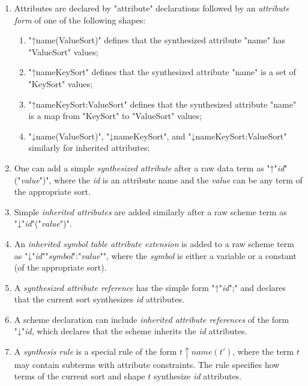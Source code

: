 \documentclass[12pt]{article} %
\begin{document}
\begin{manual}\label{man:attributes}\leavevmode
  \begin{enumerate}

  \item Attributes are declared by "attribute" declarations followed by an \emph{attribute form} of
    one of the following shapes:
    \begin{enumerate}
    \item "↑name(ValueSort)" defines that the synthesized attribute "name" has "ValueSort" values;
    \item "↑name{KeySort}" defines that the synthesized attribute "name" is a set of "KeySort" values;
    \item "↑name{KeySort:ValueSort}" defines that the synthesized attribute "name" is a map from
      "KeySort" to "ValueSort" values;
    \item "↓name(ValueSort)", "↓name{KeySort}", and "↓name{KeySort:ValueSort}" similarly for
      inherited attributes;
    \end{enumerate}

  \item One can add a simple \emph{synthesized attribute} after a raw data term as
    "↑"\emph{id}"("\emph{value}")", where the \emph{id} is an attribute name and the \emph{value}
    can be any term of the appropriate sort.

  \item Simple \emph{inherited attributes} are added similarly after a raw scheme term as
    "↓"\emph{id}"("\emph{value}")".

  \item An \emph{inherited symbol table attribute extension} is added to a raw scheme term as
    "↓"\emph{id}"{"\emph{symbol}":"\emph{value}"}", where the \emph{symbol} is either a variable
    or a constant (of the appropriate sort).

  \item A \emph{synthesized attribute reference} has the simple form "↑"\emph{id}";" and declares
    that the current sort synthesizes \emph{id} attributes.

  \item A scheme declaration can include \emph{inherited attribute references} of the form
    "↓"\emph{id}, which declares that the scheme inherits the \emph{id} attributes.

  \item A \emph{synthesis rule} is a special rule of the form $t↑name(t')$, where the term $t$ may
    contain subterms with attribute constraints. The rule specifies how terms of the current sort
    and shape $t$ synthesize \emph{id} attributes.


\end{enumerate}
\end{manual}
\end{document}
